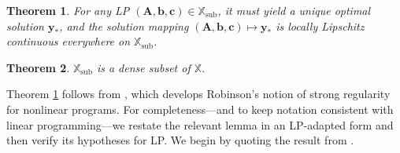 \documentclass{amsart} %
\def\vb{{\bm{b}}}
\def\vc{{\bm{c}}}
\def\vy{{\bm{y}}}
\def\mA{{\bm{A}}}
\def\sX{{\mathbb{X}}}
\newtheorem{theorem}{Theorem}[section]
\theoremstyle{definition}
\theoremstyle{remark}
\begin{document}
\begin{theorem}
\label{thm:lp-regular}
For any LP $(\mA,\vb,\vc) \in \sX_{\mathrm{sub}}$, it must yield a unique optimal solution $\vy_\ast$, and the solution mapping $(\mA,\vb,\vc) \mapsto \vy_\ast$ is locally Lipschitz continuous everywhere on $\sX_{\mathrm{sub}}$.
\end{theorem}

\begin{theorem}
\label{thm:lp-dense}
$\sX_{\mathrm{sub}}$ is a dense subset of $\sX$.
\end{theorem}

Theorem \ref{thm:lp-regular} follows from \cite{dontchev1996characterizations}, which develops Robinson’s notion of strong regularity \cite{robinson1980strongly} for nonlinear programs. For completeness—and to keep notation consistent with linear programming—we restate the relevant lemma in an LP-adapted form and then verify its hypotheses for LP. We begin by quoting the result from \cite{dontchev1996characterizations}.
\end{document}
